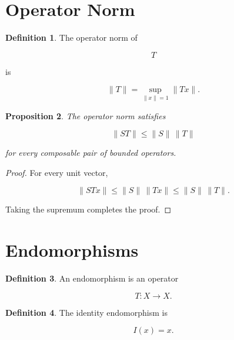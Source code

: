 \documentclass[11pt]{book}
\numberwithin{equation}{chapter}
\theoremstyle{definition}
\newtheorem{definition}{Definition}[chapter]
\theoremstyle{plain}
\newtheorem{proposition}[definition]{Proposition}
\begin{document}
\section{Operator Norm}

\begin{definition}

The operator norm of

\[
T
\]

is

\[
\|T\|
=
\sup_{\|x\|=1}
\|Tx\|.
\]

\end{definition}


\begin{proposition}

The operator norm satisfies

\[
\|ST\|
\le
\|S\|
\,
\|T\|
\]

for every composable pair of bounded operators.

\end{proposition}

\begin{proof}

For every unit vector,

\[
\|STx\|
\le
\|S\|
\,
\|Tx\|
\le
\|S\|
\,
\|T\|.
\]

Taking the supremum completes the proof.

\end{proof}


\section{Endomorphisms}

\begin{definition}

An endomorphism is an operator

\[
T:X\rightarrow X.
\]

\end{definition}


\begin{definition}

The identity endomorphism is

\[
I(x)=x.
\]

\end{definition}
\end{document}
